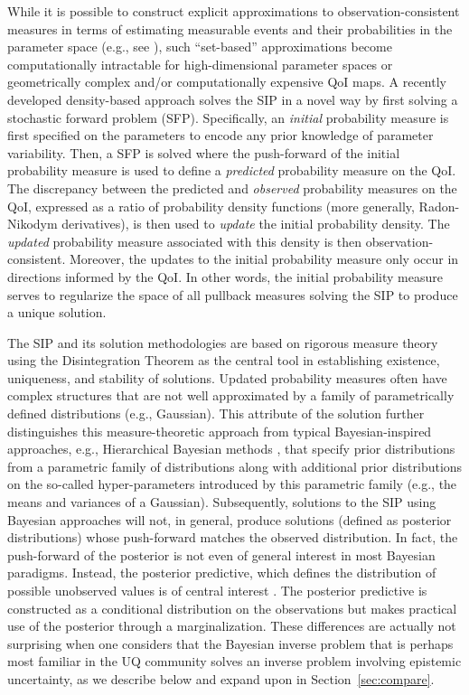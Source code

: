 While it is possible to construct explicit approximations to observation-consistent measures in terms of estimating measurable events and their probabilities in the parameter space (e.g., see \cite{BET+14}), such ``set-based'' approximations become computationally intractable for high-dimensional parameter spaces or geometrically complex and/or computationally expensive QoI maps.
A recently developed density-based approach \citep{BJW18a, BJW18b, BWY20} solves the SIP in a novel way by first solving a stochastic forward problem (SFP).
Specifically, an {\em initial} probability measure is first specified on the parameters to encode any prior knowledge of parameter variability.
Then, a SFP is solved where the push-forward of the initial probability measure is used to define a {\em predicted} probability measure on the QoI.
The discrepancy between the predicted and {\em observed} probability measures on the QoI, expressed as a ratio of probability density functions (more generally, Radon-Nikodym derivatives), is then used to {\em update} the initial probability density.
The {\em updated} probability measure associated with this density is then observation-consistent.
Moreover, the updates to the initial probability measure only occur in directions informed by the QoI.
In other words, the initial probability measure serves to regularize the space of all pullback measures solving the SIP to produce a unique solution.

The SIP and its solution methodologies are based on rigorous measure theory using the Disintegration Theorem \citep{Dellacherie_Meyer_book} as the central tool in establishing existence, uniqueness, and stability of solutions.
Updated probability measures often have complex structures that are not well approximated by a family of parametrically defined distributions (e.g., Gaussian).
This attribute of the solution further distinguishes this measure-theoretic approach from typical Bayesian-inspired approaches, e.g., Hierarchical Bayesian methods \citep{Smith, Tarantola_book, Wikle1998}, that specify prior distributions from a parametric family of distributions along with additional prior distributions on the so-called hyper-parameters introduced by this parametric family (e.g., the means and variances of a Gaussian).
Subsequently, solutions to the SIP using Bayesian approaches will not, in general, produce solutions (defined as posterior distributions) whose push-forward matches the observed distribution.
In fact, the push-forward of the posterior is not even of general interest in most Bayesian paradigms.
Instead, the posterior predictive, which defines the distribution of possible unobserved values is of central interest \cite{Smith}.
The posterior predictive is constructed as a conditional distribution on the observations but makes practical use of the posterior through a marginalization.
These differences are actually not surprising when one considers that the Bayesian inverse problem that is perhaps most familiar in the UQ community solves an inverse problem involving epistemic uncertainty, as we describe below and expand upon in Section~\ref{sec:compare}.

